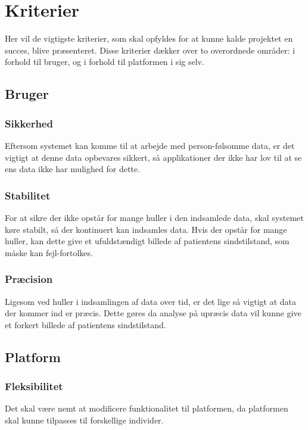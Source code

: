 \section{Kriterier}
Her vil de vigtigste kriterier, som skal opfyldes for at kunne kalde projektet en succes, blive præsenteret.
Disse kriterier dækker over to overordnede områder: i forhold til bruger, og i forhold til platformen i sig selv.

\subsection{Bruger}

\subsubsection{Sikkerhed}
Eftersom systemet kan komme til at arbejde med person-følsomme data, er det vigtigt at denne data opbevares sikkert, så applikationer der ikke har lov til at se ens data ikke har mulighed for dette.

\subsubsection{Stabilitet}
For at sikre der ikke opstår for mange huller i den indsamlede data, skal systemet køre stabilt, så der kontinuert kan indsamles data.
Hvis der opstår for mange huller, kan dette give et ufuldstændigt billede af patientens sindstilstand, som måske kan fejl-fortolkes.

\subsubsection{Præcision}
Ligesom ved huller i indsamlingen af data over tid, er det lige så vigtigt at data der kommer ind er præcis.
Dette gøres da analyse på upræcis data vil kunne give et forkert billede af patientens sindstilstand.

\subsection{Platform}

\subsubsection{Fleksibilitet}
Det skal være nemt at modificere funktionalitet til platformen, da platformen skal kunne tilpasses til forskellige individer.

